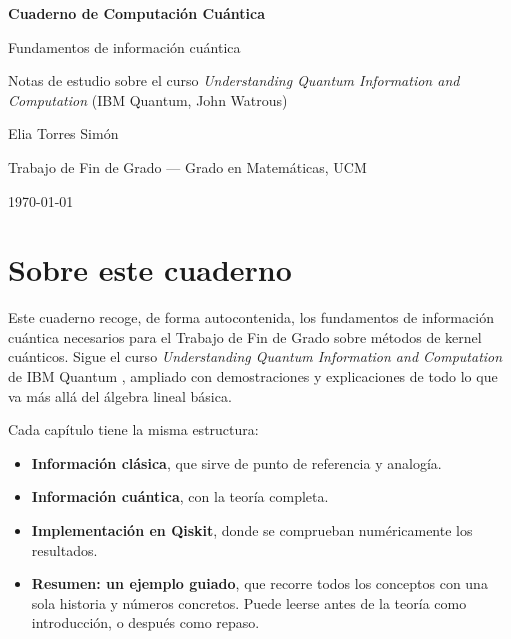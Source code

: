 \documentclass[11pt, a4paper, twoside, openright]{report}
\begin{document}
\begin{titlepage}
\centering
\vspace*{4cm}
{\Huge\bfseries Cuaderno de Computación Cuántica\par}
\vspace{1cm}
{\Large Fundamentos de información cuántica\par}
\vspace{2cm}
{\large Notas de estudio sobre el curso \textit{Understanding Quantum Information and Computation} (IBM Quantum, John Watrous)\par}
\vfill
{\large Elia Torres Simón\par}
\vspace{0.5cm}
{\large Trabajo de Fin de Grado --- Grado en Matemáticas, UCM\par}
\vspace{0.5cm}
{\large \today\par}
\end{titlepage}

\cleardoublepage
\thispagestyle{empty}
\section*{Sobre este cuaderno}

\noindent Este cuaderno recoge, de forma autocontenida, los fundamentos de información cuántica necesarios para el Trabajo de Fin de Grado sobre métodos de kernel cuánticos. Sigue el curso \textit{Understanding Quantum Information and Computation} de IBM Quantum \cite{watrous2024understanding}, ampliado con demostraciones y explicaciones de todo lo que va más allá del álgebra lineal básica.

\noindent Cada capítulo tiene la misma estructura:
\begin{itemize}
    \item \textbf{Información clásica}, que sirve de punto de referencia y analogía.
    \item \textbf{Información cuántica}, con la teoría completa.
    \item \textbf{Implementación en Qiskit}, donde se comprueban numéricamente los resultados.
    \item \textbf{Resumen: un ejemplo guiado}, que recorre todos los conceptos con una sola historia y números concretos. Puede leerse antes de la teoría como introducción, o después como repaso.
\end{itemize}
\end{document}
